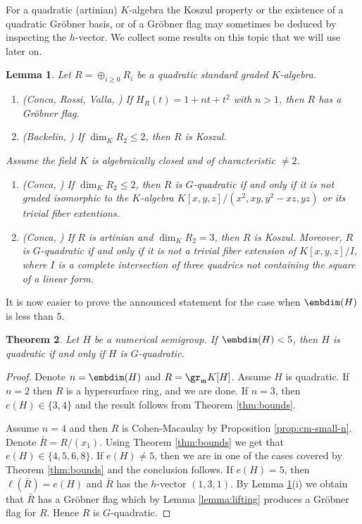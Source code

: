 \documentclass[12pt]{amsart}
\def\frk{\mathfrak}               %
\def\mm{{\frk m}}
\newtheorem{Theorem}{Theorem}[section]
\newtheorem{Lemma}[Theorem]{Lemma}
\begin{document}
For a quadratic (artinian) $K$-algebra  the Koszul property or the existence of a quadratic Gr\"obner basis, or of a Gr\"obner flag   
may sometimes be deduced by inspecting the $h$-vector. 
We collect  some   results on this topic that we will use later on.

\begin{Lemma} 
\label{lemma:tools}
Let $R=\oplus_{i\geq 0}R_i$ be a quadratic standard graded $K$-algebra.
\begin{enumerate} 
\item [(i)] (Conca, Rossi, Valla, \cite[Proposition 2.12]{CRV}) If $H_R(t)=1+nt+t^2$ with $n>1$, then $R$ has a Gr\"obner flag.
\item [(ii)] (Backelin, \cite[Theorem 4.8]{Backelin-thesis}) If $\dim_K R_2 \leq 2$, then  $R$ is Koszul.
\end{enumerate}
\noindent Assume the field $K$ is algebraically closed and of characteristic $\neq 2$.
\begin{enumerate}
\item [(iii)] (Conca, \cite[Theorem 1]{Conca-quadrics})  If $\dim_K R_2 \leq 2$, then $R$ is $G$-quadratic if and only if  
it is not graded isomorphic to the $K$-algebra $K[x,y,z]/(x^2, xy, y^2-xz, yz)$ or its trivial fiber extentions.
\item [(iv)] (Conca, \cite[Theorem 1.1]{Conca-quadrics-codim3}) If $R$ is artinian and $\dim_K R_2=3$, then $R$ is Koszul. Moreover, $R$ is $G$-quadratic
if and only if it is not a trivial fiber extension of $K[x,y,z]/I$, where $I$ is a complete  intersection of three quadrics not containing the square of a linear form.
\end{enumerate}
\end{Lemma}


It is now easier to prove the announced statement for the case when $\embdim(H)$ is less than $5$.

\begin{Theorem}
\label{thm:edim234}
Let $H$ be a   numerical semigroup.
If $\embdim(H) <5$, then $H$ is quadratic if and only if $H$ is  $G$-quadratic.
\end{Theorem}

\begin{proof}
Denote $n=\embdim(H)$ and $R=\gr_\mm K[H]$. Assume $H$ is quadratic.
 If $n=2$  then $R$ is a hypersurface ring, and we are done. If $n=3$, then $e(H) \in \{3, 4\}$ and the result follows from  Theorem \ref{thm:bounds}.

Assume  $n=4$ and then $R$ is Cohen-Macaulay by Proposition \ref{prop:cm-small-n}. 
Denote $\bar{R}=R/(x_1)$. Using Theorem \ref{thm:bounds} we get that $e(H) \in \{4,5,6,8\}$. If $e(H)\neq 5$, then  we are in one of the cases covered by Theorem \ref{thm:bounds}
and the conclusion follows. If $e(H)=5$, then $\ell(\bar{R})=e(H)$ and $\bar{R}$ has the $h$-vector $(1,3,1)$.  By Lemma \ref{lemma:tools}(i) we obtain that $\bar{R}$ has a Gr\"obner flag
which by Lemma \ref{lemma:lifting} produces a Gr\"obner flag for $R$.  Hence $R$ is $G$-quadratic.
\end{proof}
\end{document}
